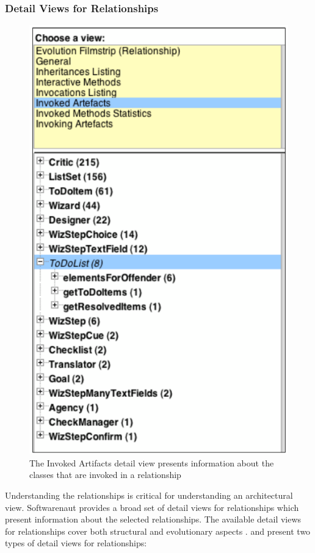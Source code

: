 \documentclass[preprint,12pt]{elsarticle}
\begin{document}
\subsubsection {Detail Views for Relationships}


\begin{figure}[t]
\begin{center}
\includegraphics[width=0.44\linewidth]{DetailsForEdgesAndNodes}
\caption{The Invoked Artifacts detail view presents information about the classes that are invoked in a relationship} 
\end{center}
\end{figure}

Understanding the relationships is critical for understanding an architectural view. Softwarenaut provides a broad set of detail views for relationships which present information about the selected relationships. The available detail views for relationships cover both structural and evolutionary aspects \cite{lungu-cutedge, lungu-relevo}.  and  present two types of detail views for relationships: 
\end{document}
